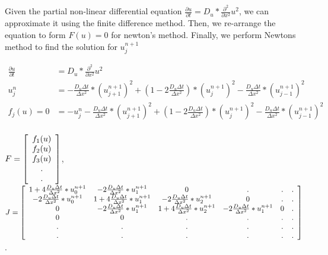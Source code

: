 \documentclass[11pt]{article}
\begin{document}
Given the partial non-linear differential equation $\frac{\partial u}{\partial t} = D_u * \frac{\partial^{2}}{\partial x^{2}}u^2$, we can approximate it using the finite difference method. Then, we re-arrange the equation to form $F(u)=0$ for newton's method. Finally, we perform Newtons method to find the solution for $u^{n+1}_{j}$

\begin{align*}
    \frac{\partial u}{\partial t} &= D_u * \frac{\partial^{2}}{\partial x^{2}}u^2\\
    u^{n}_{j} &= -\frac{D_u\Delta t}{\Delta x^2}*(u^{n+1}_{j+1})^2 + (1-2\frac{D_u\Delta t}{\Delta x^2})*(u^{n+1}_{j})^2 - \frac{D_u\Delta t}{\Delta x^2}*(u^{n+1}_{j-1})^2\\
    f_j(u) = 0 &= -u^{n}_{j}-\frac{D_u\Delta t}{\Delta x^2}*(u^{n+1}_{j+1})^2 + (1-2\frac{D_u\Delta t}{\Delta x^2})*(u^{n+1}_{j})^2 - \frac{D_u\Delta t}{\Delta x^2}*(u^{n+1}_{j-1})^2 \\
\end{align*}

$F = 
\left[ {\begin{array}{*{20}c}
   f_1(u) \\
   f_2(u) \\
   f_3(u) \\
   . \\
   . \\
 \end{array} } \right]
$, $J = 
\left[ {\begin{array}{*{20}c}
   1+4\frac{D_u\Delta t}{\Delta x^2}*u^{n+1}_0 & -2\frac{D_u\Delta t}{\Delta x^2}*u^{n+1}_1 & 0 & . & . & . \\
   -2\frac{D_u\Delta t}{\Delta x^2}*u^{n+1}_0 & 1+4\frac{D_u\Delta t}{\Delta x^2}*u^{n+1}_1 & -2\frac{D_u\Delta t}{\Delta x^2}*u^{n+1}_2 & 0 & . & . \\
   0 & -2\frac{D_u\Delta t}{\Delta x^2}*u^{n+1}_1 & 1+4\frac{D_u\Delta t}{\Delta x^2}*u^{n+1}_2 & -2\frac{D_u\Delta t}{\Delta x^2}*u^{n+1}_1 & 0 & . \\
   0 & 0 & . & . & . & .\\
   . & . & . & . & . & .\\
   . & . & . & . & . & .\\
 \end{array} } \right]
$.
\end{document}
